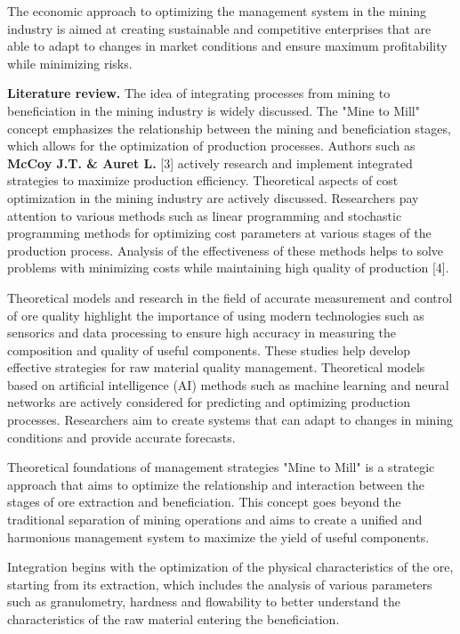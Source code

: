 \begin{multicols}{2}
The economic approach to optimizing the management system in the mining
industry is aimed at creating sustainable and competitive enterprises
that are able to adapt to changes in market conditions and ensure
maximum profitability while minimizing risks.

{\bfseries Literature review.} The idea of
\hspace{0pt}\hspace{0pt}integrating processes from mining to
beneficiation in the mining industry is widely discussed. The "Mine to
Mill" concept emphasizes the relationship between the mining and
beneficiation stages, which allows for the optimization of production
processes. Authors such as {\bfseries McCoy J.T. \& Auret L.} {[}3{]}
actively research and implement integrated strategies to maximize
production efficiency. Theoretical aspects of cost optimization in the
mining industry are actively discussed. Researchers pay attention to
various methods such as linear programming and stochastic programming
methods for optimizing cost parameters at various stages of the
production process. Analysis of the effectiveness of these methods helps
to solve problems with minimizing costs while maintaining high quality
of production {[}4{]}.

Theoretical models and research in the field of accurate measurement and
control of ore quality highlight the importance of using modern
technologies such as sensorics and data processing to ensure high
accuracy in measuring the composition and quality of useful components.
These studies help develop effective strategies for raw material quality
management. Theoretical models based on artificial intelligence (AI)
methods such as machine learning and neural networks are actively
considered for predicting and optimizing production processes.
Researchers aim to create systems that can adapt to changes in mining
conditions and provide accurate forecasts.

Theoretical foundations of management strategies "Mine to Mill" is a
strategic approach that aims to optimize the relationship and
interaction between the stages of ore extraction and beneficiation. This
concept goes beyond the traditional separation of mining operations and
aims to create a unified and harmonious management system to maximize
the yield of useful components.

Integration begins with the optimization of the physical characteristics
of the ore, starting from its extraction, which includes the analysis of
various parameters such as granulometry, hardness and flowability to
better understand the characteristics of the raw material entering the
beneficiation.


\end{multicols}
